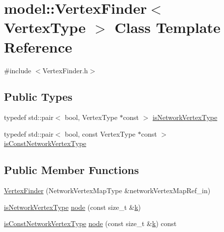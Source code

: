 \hypertarget{classmodel_1_1_vertex_finder}{}\section{model\+:\+:Vertex\+Finder$<$ Vertex\+Type $>$ Class Template Reference}
\label{classmodel_1_1_vertex_finder}


{\ttfamily \#include $<$Vertex\+Finder.\+h$>$}

\subsection*{Public Types}
\begin{DoxyCompactItemize}
\item 
typedef std\+::pair$<$ bool, Vertex\+Type $\ast$const  $>$ \hyperlink{classmodel_1_1_vertex_finder_a580eb0d98c227cf1bc3454129f7013be}{is\+Network\+Vertex\+Type}
\item 
typedef std\+::pair$<$ bool, const Vertex\+Type $\ast$const  $>$ \hyperlink{classmodel_1_1_vertex_finder_a0aae6271195a839940b5f3be47ffefc6}{is\+Const\+Network\+Vertex\+Type}
\end{DoxyCompactItemize}
\subsection*{Public Member Functions}
\begin{DoxyCompactItemize}
\item 
\hyperlink{classmodel_1_1_vertex_finder_a57518655bae1744c42a4dcd7ece11ca3}{Vertex\+Finder} (Network\+Vertex\+Map\+Type \&network\+Vertex\+Map\+Ref\+\_\+in)
\item 
\hyperlink{classmodel_1_1_vertex_finder_a580eb0d98c227cf1bc3454129f7013be}{is\+Network\+Vertex\+Type} \hyperlink{classmodel_1_1_vertex_finder_aaf29364c21d0b5c7267cc0cedb3327f9}{node} (const size\+\_\+t \&\hyperlink{_f_e_m_2linear__elasticity__3d_2tetgen_2generate_p_o_l_ycube_8m_a5d2aad4440da75aa43f2643e72b1a3bd}{k})
\item 
\hyperlink{classmodel_1_1_vertex_finder_a0aae6271195a839940b5f3be47ffefc6}{is\+Const\+Network\+Vertex\+Type} \hyperlink{classmodel_1_1_vertex_finder_aaec0e2af2d810dcdfe27d02f0d2a4c3f}{node} (const size\+\_\+t \&\hyperlink{_f_e_m_2linear__elasticity__3d_2tetgen_2generate_p_o_l_ycube_8m_a5d2aad4440da75aa43f2643e72b1a3bd}{k}) const 
\end{DoxyCompactItemize}


